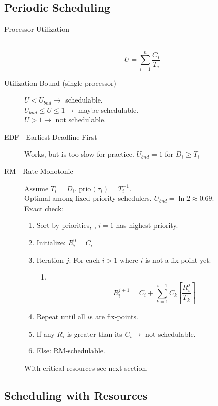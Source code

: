 \subsection{Periodic Scheduling}
\begin{description}
	\item[Processor Utilization] \ 
	\[ U = \sum_{i=1}^n \frac{C_i}{T_i} \]
	\item[Utilization Bound (single processor)] $U < U_{bnd} \rightarrow$
	schedulable.\\
	$U_{bnd} \leq U \leq 1 \rightarrow$ maybe schedulable.\\
	$U > 1 \rightarrow$ not schedulable.
	\item[EDF - Earliest Deadline First] Works, but is too slow for practice.
	$U_{bnd} = 1$ for $D_i \geq T_i$
	\item[RM - Rate Monotonic] Assume $T_i = D_i$. prio$(\tau_i) = T_i^{-1}$.\\
	Optimal among fixed priority schedulers. $U_{bnd} = \ln 2 \approx 0.69$.\\
	Exact check:
	\begin{enumerate}
		\item Sort by priorities, \ie, $i = 1$ has highest priority.
		\item Initialize: $R^0_i = C_i$
		\item Iteration $j$: For each $i > 1$ where $i$ is not a fix-point yet:
			\begin{enumerate}
				\item \ 
				\[ R_i^{j+1} = C_i + \sum_{k=1}^{i-1} C_k \left\lceil \frac{R_i^j}{T_k}
				\right\rceil \]
			\end{enumerate}
		\item Repeat until all $i$s are fix-points.
		\item If any $R_i$ is greater than its $C_i \rightarrow$ not schedulable.
		\item Else: RM-schedulable. 
	\end{enumerate}
	With critical resources see next section.
\end{description}

\subsection{Scheduling with Resources}

